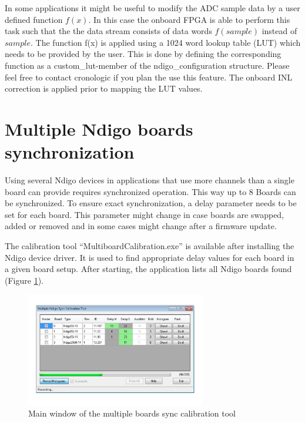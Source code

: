 		In some applications it might be useful to modify the ADC sample data by a user defined function $f(x)$. In this case the onboard FPGA is able to perform this task such that the the data stream consists of data words $f(sample)$ instead of $sample$. The function f(x) is applied using a 1024 word lookup table (LUT) which needs to be provided by the user. This is done by defining the corresponding function as a custom\_lut-member of the ndigo\_configuration structure. Please feel free to contact cronologic if you plan the use this feature. The onboard INL correction is applied prior to mapping the LUT values.  
	
\section{Multiple Ndigo boards synchronization}
	Using several Ndigo devices in applications that use more channels than a single board can provide requires synchronized operation. This way up to 8 Boards can be synchronized. To ensure exact synchronization, a delay parameter needs to be set for each board. This parameter might change in case boards are swapped, added or removed and in some cases might change after a firmware update.\par
	
	The calibration tool ``MultiboardCalibration.exe'' is available after installing the Ndigo device driver. It is used to find appropriate delay values for each board in a given board setup. After starting, the application lists all Ndigo boards found (Figure \ref{fig:SyncCalibTool}).\par

	\begin{figure}[ht]
		\begin{center}
			\includegraphics[width=0.7\textwidth]{figures/SyncCalibTool.pdf}
			\caption{Main window of the multiple boards sync calibration tool\label{fig:SyncCalibTool}}
		\end{center}
	\end{figure}

